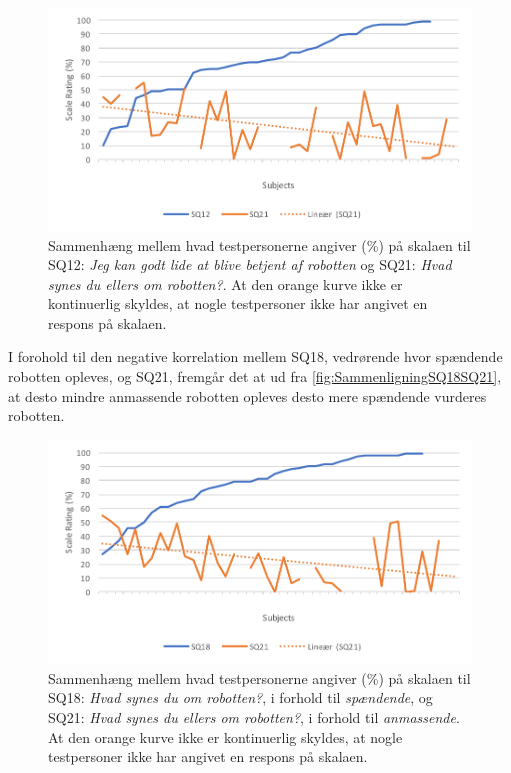 \begin{figure}[H]
	\centering
	\includegraphics[width=\textwidth]{Figure/Korrelationsgrafer/SQ12+SQ21}
	\caption{Sammenhæng mellem hvad testpersonerne angiver (\%) på skalaen til SQ12: \textit{Jeg kan godt lide at blive betjent af robotten} og SQ21: \textit{Hvad synes du ellers om robotten?}. At den orange kurve ikke er kontinuerlig skyldes, at nogle testpersoner ikke har angivet en respons på skalaen.}
	\label{fig:SammenligningSQ12SQ21}
\end{figure}
\noindent
%
I forohold til den negative korrelation mellem SQ18, vedrørende hvor spændende robotten opleves, og SQ21, fremgår det at ud fra \autoref{fig:SammenligningSQ18SQ21}, at desto mindre anmassende robotten opleves desto mere spændende vurderes robotten. 
%
\begin{figure}[H]
	\centering
	\includegraphics[width=\textwidth]{Figure/Korrelationsgrafer/SQ18+SQ21}
	\caption{Sammenhæng mellem hvad testpersonerne angiver (\%) på skalaen til SQ18: \textit{Hvad synes du om robotten?}, i forhold til \textit{spændende}, og SQ21: \textit{Hvad synes du ellers om robotten?}, i forhold til \textit{anmassende}. At den orange kurve ikke er kontinuerlig skyldes, at nogle testpersoner ikke har angivet en respons på skalaen.}
	\label{fig:SammenligningSQ18SQ21}
\end{figure}

